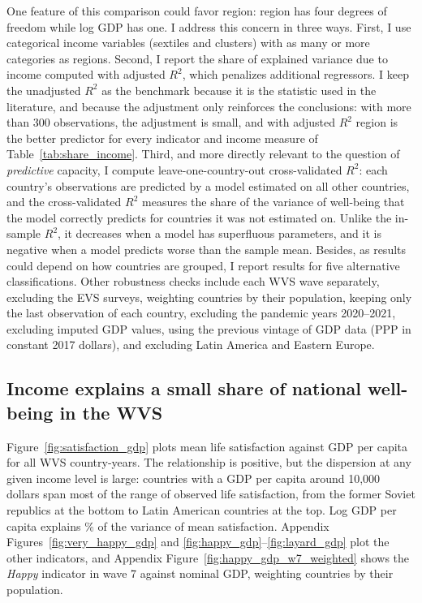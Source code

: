 \documentclass[12pt]{article}
\begin{document}
One feature of this comparison could favor region: region has four degrees of freedom while log GDP has one. I address this concern in three ways. First, I use categorical income variables (sextiles and clusters) with as many or more categories as regions. Second, I report the share of explained variance due to income computed with adjusted $R^2$, which penalizes additional regressors. I keep the unadjusted $R^2$ as the benchmark because it is the statistic used in the literature, and because the adjustment only reinforces the conclusions: with more than 300 observations, the adjustment is small, and with adjusted $R^2$ region is the better predictor for every indicator and income measure of Table~\ref{tab:share_income}. Third, and more directly relevant to the question of \textit{predictive} capacity, I compute leave-one-country-out cross-validated $R^2$: each country's observations are predicted by a model estimated on all other countries, and the cross-validated $R^2$ measures the share of the variance of well-being that the model correctly predicts for countries it was not estimated on. Unlike the in-sample $R^2$, it decreases when a model has superfluous parameters, and it is negative when a model predicts worse than the sample mean. Besides, as results could depend on how countries are grouped, I report results for five alternative classifications. Other robustness checks include each WVS wave separately, excluding the EVS surveys, weighting countries by their population, keeping only the last observation of each country, excluding the pandemic years 2020--2021, excluding imputed GDP values, using the previous vintage of GDP data (PPP in constant 2017 dollars), and excluding Latin America and Eastern Europe.

\subsection{Income explains a small share of national well-being in the WVS}\label{subsec:r2_income}

Figure~\ref{fig:satisfaction_gdp} plots mean life satisfaction against GDP per capita for all WVS country-years. The relationship is positive, but the dispersion at any given income level is large: countries with a GDP per capita around 10,000 dollars span most of the range of observed life satisfaction, from the former Soviet republics at the bottom to Latin American countries at the top. Log GDP per capita explains \RtwoSatisfiedMeanPPP\% of the variance of mean satisfaction.
Appendix Figures~\ref{fig:very_happy_gdp} and \ref{fig:happy_gdp}--\ref{fig:layard_gdp} plot the other indicators, and Appendix Figure~\ref{fig:happy_gdp_w7_weighted} shows the \textit{Happy} indicator in wave 7 against nominal GDP, weighting countries by their population.
\end{document}
